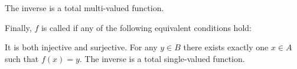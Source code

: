 \begin{definition}
\begin{thmenum}
\begin{minipage}[t]{0.44\textwidth}
\begin{thmenum}[leftmargin=0.9cm]
         The inverse is a total multi-valued function.
      \end{thmenum}
    \end{minipage}

     Finally, \( f \) is called  if any of the following equivalent conditions hold:
    \begin{thmenum}
       It is both injective and surjective.
       For any \( y \in B \) there exists exactly one \( x \in A \) such that \( f(x) = y \).
       The inverse is a total single-valued function.
    \end{thmenum}
  \end{thmenum}
\end{definition}

